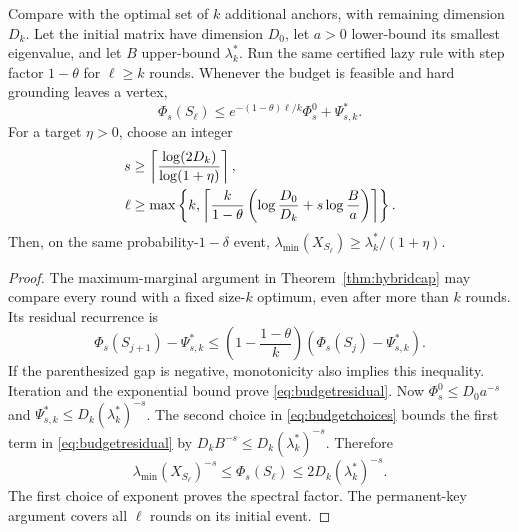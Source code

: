 \begin{corollary}\label{cor:spectralbudget}
Compare with the optimal set of $k$ additional anchors, with
remaining dimension $D_k$. Let the initial matrix have dimension
$D_0$, let $a>0$ lower-bound its smallest eigenvalue, and let
$B$ upper-bound $\lambda_k^*$. Run the same certified lazy rule
with step factor $1-\theta$ for $\ell\geq k$ rounds.
Whenever the budget is feasible and hard grounding leaves a vertex,
\begin{equation}\label{eq:budgetresidual}
 \Phi_s(S_\ell)
 \leq e^{-(1-\theta)\ell/k}\Phi_s^0+\Psi_{s,k}^*.
\end{equation}
For a target $\eta>0$, choose an integer
\begin{align}
 s&\geq\left\lceil\frac{\log(2D_k)}{\log(1+\eta)}\right\rceil,
 \label{eq:budgetchoices}\\
 \ell&\geq\max\left\{k,
 \left\lceil\frac{k}{1-\theta}
       \left(\log\frac{D_0}{D_k}+s\log\frac Ba\right)\right\rceil
              \right\}.\notag
\end{align}
Then, on the same probability-$1-\delta$ event,
$\lambda_{\min}(X_{S_\ell})\geq\lambda_k^*/(1+\eta)$.
\end{corollary}
\begin{proof}
The maximum-marginal argument in Theorem~\ref{thm:hybridcap} may
compare every round with a fixed size-$k$ optimum, even after
more than $k$ rounds. Its residual recurrence is
\[
 \Phi_s(S_{j+1})-\Psi_{s,k}^*
 \leq\left(1-\frac{1-\theta}{k}\right)
               (\Phi_s(S_j)-\Psi_{s,k}^*).
\]
If the parenthesized gap is negative, monotonicity also implies
this inequality. Iteration and the exponential bound prove
\eqref{eq:budgetresidual}. Now $\Phi_s^0\leq D_0a^{-s}$ and
$\Psi_{s,k}^*\leq D_k(\lambda_k^*)^{-s}$.
The second choice in \eqref{eq:budgetchoices} bounds the first
term in \eqref{eq:budgetresidual} by
$D_k B^{-s}\leq D_k(\lambda_k^*)^{-s}$. Therefore
\[
 \lambda_{\min}(X_{S_\ell})^{-s}
 \leq\Phi_s(S_\ell)\leq2D_k(\lambda_k^*)^{-s}.
\]
The first choice of exponent proves the spectral factor.
The permanent-key argument covers all $\ell$ rounds on its initial event.
\end{proof}

